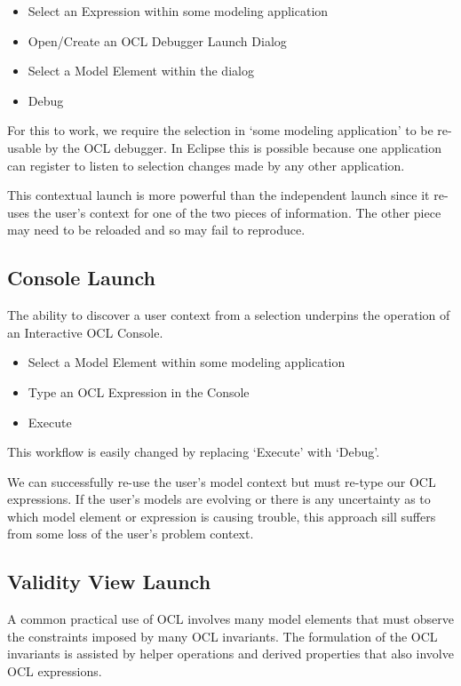 \documentclass[a4paper]{article}
\begin{document}
\begin{itemize}
\item Select an Expression within some modeling application
\item Open/Create an OCL Debugger Launch Dialog
\item Select a Model Element within the dialog
\item Debug
\end{itemize}

For this to work, we require the selection in `some modeling application' to be re-usable by the OCL debugger. In Eclipse this is possible because one application can register to listen to selection changes made by any other application.

This contextual launch is more powerful than the independent launch since it re-uses the user's context for one of the two pieces of information. The other piece may need to be reloaded and so may fail to reproduce.

\subsection{Console Launch}

The ability to discover a user context from a selection underpins the operation of an Interactive OCL Console.

\begin{itemize}
\item Select a Model Element within some modeling application
\item Type an OCL Expression in the Console
\item Execute
\end{itemize}

This workflow is easily changed by replacing `Execute' with `Debug'.

We can successfully re-use the user's model context but must re-type our OCL expressions. If the user's models are evolving or there is any uncertainty as to which model element or expression is causing trouble, this approach sill suffers from some loss of the user's problem context.

\subsection{Validity View Launch}

A common practical use of OCL involves many model elements that must observe the constraints imposed by many OCL invariants. The formulation of the OCL invariants is assisted by helper operations and derived properties that also involve OCL expressions.
\end{document}
